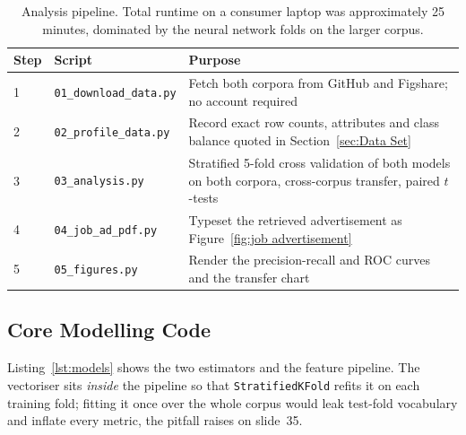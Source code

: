 \begin{table}[h]
\centering
\caption{Analysis pipeline. Total runtime on a consumer laptop was approximately
25 minutes, dominated by the neural network folds on the larger corpus.}
\label{tab:pipeline}
\begin{tabular}{llp{6.2cm}}
\toprule
\textbf{Step} & \textbf{Script} & \textbf{Purpose} \\
\midrule
1 & \texttt{01\_download\_data.py} & Fetch both corpora from GitHub and Figshare; no
                                     account required \\
2 & \texttt{02\_profile\_data.py}  & Record exact row counts, attributes and class balance
                                     quoted in Section~\ref{sec:Data Set} \\
3 & \texttt{03\_analysis.py}       & Stratified 5-fold cross validation of both models on
                                     both corpora, cross-corpus transfer, paired $t$-tests \\
4 & \texttt{04\_job\_ad\_pdf.py}   & Typeset the retrieved advertisement as
                                     Figure~\ref{fig:job advertisement} \\
5 & \texttt{05\_figures.py}        & Render the precision-recall and ROC curves and the
                                     transfer chart \\
\bottomrule
\end{tabular}
\end{table}

\subsection{Core Modelling Code}

Listing~\ref{lst:models} shows the two estimators and the feature pipeline. The
vectoriser sits \emph{inside} the pipeline so that
\texttt{StratifiedKFold} refits it on each training fold; fitting it once over the whole
corpus would leak test-fold vocabulary and inflate every metric, the pitfall
\citet{pageEvaluating} raises on slide~35.

